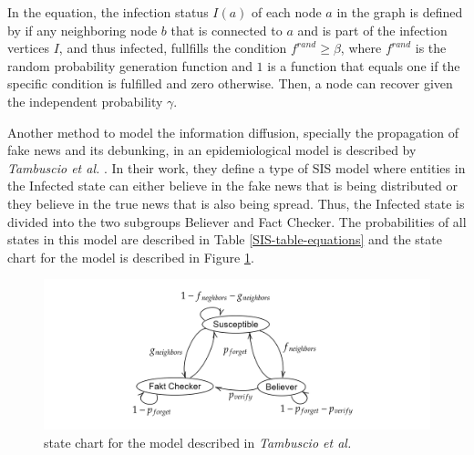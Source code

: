 In the equation, the infection status $I(a)$ of each node $a$
in the graph is defined by if any neighboring node $b$ that is connected 
to $a$ and is part of the infection vertices $I$, 
and thus infected, fullfills the condition $f^{rand}\geq \beta$,
where $f^{rand}$ is the random probability generation function and $1$ 
is a function that equals one if the specific condition is fulfilled and 
zero otherwise. Then, a node can recover given the independent probability
$\gamma$.

Another method to model the information diffusion, specially the propagation of 
fake news and its debunking, in an epidemiological model
is described by \textit{Tambuscio et al.} \cite{sirsmodel}. In their work, they
define a type of SIS model where entities in the \glqq Infected\grqq{} state 
can either believe in the fake news that is being distributed or they believe 
in the true news that is also being spread. Thus, the \glqq Infected\grqq{}
state is divided into the two subgroups \glqq Believer\grqq{} and
\glqq Fact Checker\grqq{}. The probabilities of all states in this
model are described in Table \ref{SIS-table-equations} and the state chart 
for the model is described in Figure \ref{originalmodelstatechart}. 

\begin{figure}[!ht]
    \center
    \includegraphics[scale=.15]{figs/Tambuscio.png}
    \caption{state chart for the model described
    in \textit{Tambuscio et al.} \cite{sirsmodel}}
    \label{originalmodelstatechart}
\end{figure}

